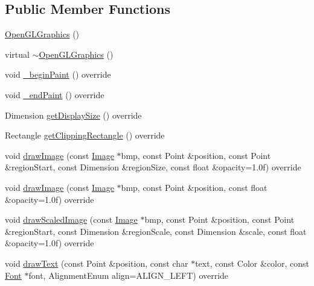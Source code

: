 \subsection*{Public Member Functions}
\begin{DoxyCompactItemize}
\item 
\mbox{\hyperlink{classagui_1_1_open_g_l_graphics_a31085468a7f2df56d6e5fba0cefe2ebd}{Open\+G\+L\+Graphics}} ()
\item 
virtual \mbox{\hyperlink{classagui_1_1_open_g_l_graphics_a4b062b45f3c7bc4f63c925f6f12cda92}{$\sim$\+Open\+G\+L\+Graphics}} ()
\item 
void \mbox{\hyperlink{classagui_1_1_open_g_l_graphics_ad0158ea89307d21c96cde0a47e982f72}{\+\_\+begin\+Paint}} () override
\item 
void \mbox{\hyperlink{classagui_1_1_open_g_l_graphics_a744c073f057d938eec458a2517f5822a}{\+\_\+end\+Paint}} () override
\item 
Dimension \mbox{\hyperlink{classagui_1_1_open_g_l_graphics_afe63a1d7c4483c1d8315d781c516f8c8}{get\+Display\+Size}} () override
\item 
Rectangle \mbox{\hyperlink{classagui_1_1_open_g_l_graphics_a6bf75c231dc6237d372b9cae8416c9ab}{get\+Clipping\+Rectangle}} () override
\item 
void \mbox{\hyperlink{classagui_1_1_open_g_l_graphics_a121498d23f1d8fc73a230ec78488734a}{draw\+Image}} (const \mbox{\hyperlink{class_image}{Image}} $\ast$bmp, const Point \&position, const Point \&region\+Start, const Dimension \&region\+Size, const float \&opacity=1.\+0f) override
\item 
void \mbox{\hyperlink{classagui_1_1_open_g_l_graphics_a1fca808a081e0afe94fe7b94d8f9ed6f}{draw\+Image}} (const \mbox{\hyperlink{class_image}{Image}} $\ast$bmp, const Point \&position, const float \&opacity=1.\+0f) override
\item 
void \mbox{\hyperlink{classagui_1_1_open_g_l_graphics_a0b7bde4bebc7566ff78f04b5656c38b9}{draw\+Scaled\+Image}} (const \mbox{\hyperlink{class_image}{Image}} $\ast$bmp, const Point \&position, const Point \&region\+Start, const Dimension \&region\+Scale, const Dimension \&scale, const float \&opacity=1.\+0f) override
\item 
void \mbox{\hyperlink{classagui_1_1_open_g_l_graphics_a454da19b9133ed6ca6defea2abc832c4}{draw\+Text}} (const Point \&position, const char $\ast$text, const Color \&color, const \mbox{\hyperlink{class_font}{Font}} $\ast$font, Alignment\+Enum align=A\+L\+I\+G\+N\+\_\+\+L\+E\+FT) override
\item 

\end{DoxyCompactItemize}
